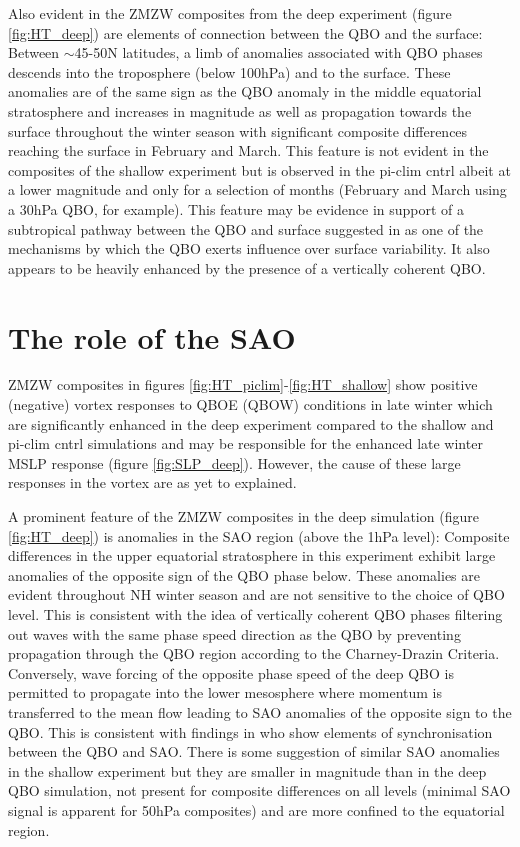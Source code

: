 Also evident in the ZMZW composites from the deep experiment (figure \ref{fig:HT_deep}) are elements of connection between the QBO and the surface: Between $\sim$45-50N latitudes, a limb of anomalies associated with QBO phases descends into the troposphere (below 100hPa) and to the surface. These anomalies are of the same sign as the QBO anomaly in the middle equatorial stratosphere and increases in magnitude as well as propagation towards the surface throughout the winter season with significant composite differences reaching the surface in February and March. This feature is not evident in the composites of the shallow experiment but is observed in the pi-clim cntrl albeit at a lower magnitude and only for a selection of months (February and March using a 30hPa QBO, for example). This feature may be evidence in support of a subtropical pathway between the QBO and surface suggested in \cite{graySurface2018b} as one of the mechanisms by which the QBO exerts influence over surface variability. It also appears to be heavily enhanced by the presence of a vertically coherent QBO.

\section{The role of the SAO}
\label{sec:role_SAO}

ZMZW composites in figures \ref{fig:HT_piclim}-\ref{fig:HT_shallow} show positive (negative) vortex responses to QBOE (QBOW) conditions in late winter which are significantly enhanced in the deep experiment compared to the shallow and pi-clim cntrl simulations and may be responsible for the enhanced late winter MSLP response (figure \ref{fig:SLP_deep}). However, the cause of these large responses in the vortex are as yet to explained. 

A prominent feature of the ZMZW composites in the deep simulation (figure \ref{fig:HT_deep}) is anomalies in the SAO region (above the 1hPa level): Composite differences in the upper equatorial stratosphere in this experiment exhibit large anomalies of the opposite sign of the QBO phase below. These anomalies are evident throughout NH winter season and are not sensitive to the choice of QBO level. This is consistent with the idea of vertically coherent QBO phases filtering out waves with the same phase speed direction as the QBO by preventing propagation through the QBO region according to the Charney-Drazin Criteria. Conversely, wave forcing of the opposite phase speed of the deep QBO is permitted to propagate into the lower mesosphere where momentum is transferred to the mean flow leading to SAO anomalies of the opposite sign to the QBO. This is consistent with findings in \citep{kuaiNonstationary2009c} who show elements of synchronisation between the QBO and SAO. There is some suggestion of similar SAO anomalies in the shallow experiment but they are smaller in magnitude than in the deep QBO simulation, not present for composite differences on all levels (minimal SAO signal is apparent for 50hPa composites) and are more confined to the equatorial region.

